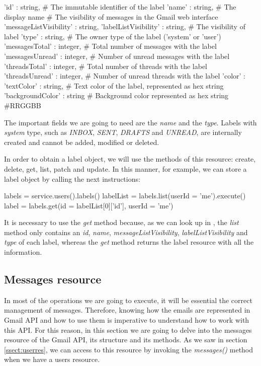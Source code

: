 \begin{python}
{
'id' : string, # The immutable identifier of the label
'name' : string, # The display name
# The visibility of messages in the Gmail web interface
'messageListVisibility' : string,
'labelListVisibility' : string, # The visibility of label
'type' : string, # The owner type of the label ('system' or 'user')
'messagesTotal' : integer, # Total number of messages with the label
'messagesUnread' : integer, # Number of unread messages with the label
'threadsTotal' : integer, # Total number of threads with the label
'threadsUnread' : integer, # Number of unread threads with the label
'color' : {
	'textColor' : string, # Text color of the label, represented as hex string
	'backgroundColor' : string # Background color represented as hex string #RRGGBB
	}
}
\end{python}

The important fields we are going to need are the \textit{name} and the \textit{type}. Labels with \textit{system} type, such as \textit{INBOX}, \textit{SENT}, \textit{DRAFTS} and \textit{UNREAD}, are internally created and cannot be added, modified or deleted.

In order to obtain a label object, we will use the methods of this resource: create, delete, get, list, patch and update. In this manner, for example, we can store a label object by calling the next instructions:

\begin{python}
labels = service.users().labels()
labelList = labels.list(userId = 'me').execute()
label = labels.get(id = labelList[0]['id'], userId = 'me')
\end{python}

It is necessary to use the \textit{get} method because, as we can look up in \cite[/v1/reference/users/labels/list]{gmailAPI}, the \textit{list} method only contains an \textit{id}, \textit{name}, \textit{messageListVisibility}, \textit{labelListVisibility} and \textit{type} of each label, whereas the \textit{get} method returns the label resource with all the information.

\subsection{Messages resource}\label{ssect:msgres}
In most of the operations we are going to execute, it will be essential the correct management of messages. Therefore, knowing how the emails are represented in Gmail API and how to use them is imperative to understand how to work with this API. For this reason, in this section we are going to delve into the messages resource of the Gmail API, its structure and its methods. As we saw in section \ref{ssect:userres}, we can access to this resource by invoking the \textit{messages()} method when we have a users resource.

